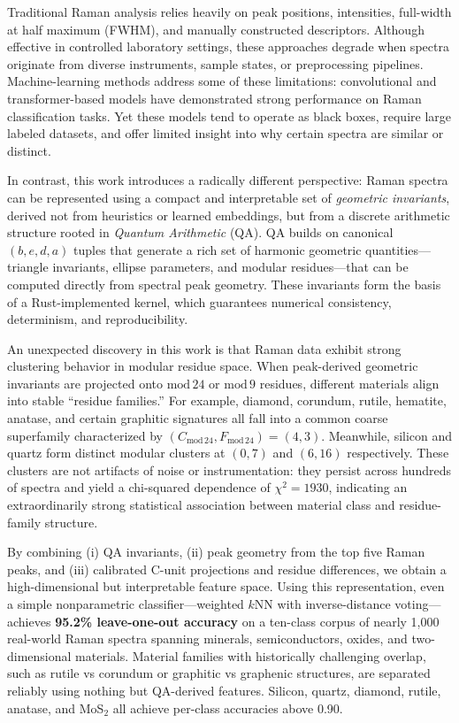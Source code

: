 \documentclass[12pt]{article}
\begin{document}
Traditional Raman analysis relies heavily on peak positions, intensities, full-width at half maximum
(FWHM), and manually constructed descriptors. Although effective in controlled laboratory settings, these
approaches degrade when spectra originate from diverse instruments, sample states, or preprocessing
pipelines. Machine-learning methods address some of these limitations: convolutional and transformer-based
models have demonstrated strong performance on Raman classification tasks. Yet these models tend to operate
as black boxes, require large labeled datasets, and offer limited insight into why certain spectra are
similar or distinct.  

In contrast, this work introduces a radically different perspective: Raman spectra can be represented using
a compact and interpretable set of \emph{geometric invariants}, derived not from heuristics or learned
embeddings, but from a discrete arithmetic structure rooted in \emph{Quantum Arithmetic} (QA). QA builds
on canonical $(b,e,d,a)$ tuples that generate a rich set of harmonic geometric quantities—triangle
invariants, ellipse parameters, and modular residues—that can be computed directly from spectral peak
geometry. These invariants form the basis of a Rust-implemented kernel, which guarantees numerical
consistency, determinism, and reproducibility.

An unexpected discovery in this work is that Raman data exhibit strong clustering behavior in modular
residue space. When peak-derived geometric invariants are projected onto $\mathrm{mod}\,24$ or
$\mathrm{mod}\,9$ residues, different materials align into stable “residue families.” For example,
diamond, corundum, rutile, hematite, anatase, and certain graphitic signatures all fall into a common
coarse superfamily characterized by $(C_{\mathrm{mod}\,24},F_{\mathrm{mod}\,24}) = (4,3)$. Meanwhile,
silicon and quartz form distinct modular clusters at $(0,7)$ and $(6,16)$ respectively. These clusters are
not artifacts of noise or instrumentation: they persist across hundreds of spectra and yield a chi-squared
dependence of $\chi^2 = 1930$, indicating an extraordinarily strong statistical association between
material class and residue-family structure.

By combining (i) QA invariants, (ii) peak geometry from the top five Raman peaks, and (iii) calibrated
C-unit projections and residue differences, we obtain a high-dimensional but interpretable feature space.
Using this representation, even a simple nonparametric classifier—weighted $k$NN with inverse-distance
voting—achieves \textbf{95.2\% leave-one-out accuracy} on a ten-class corpus of nearly 1,000 real-world
Raman spectra spanning minerals, semiconductors, oxides, and two-dimensional materials. Material families
with historically challenging overlap, such as rutile vs corundum or graphitic vs graphenic structures, are
separated reliably using nothing but QA-derived features. Silicon, quartz, diamond, rutile, anatase, and
MoS$_2$ all achieve per-class accuracies above 0.90.
\end{document}
